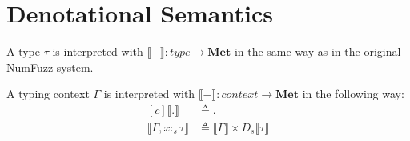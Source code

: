 \section{Denotational Semantics}
\begin{definition}
  A type $\tau$ is interpreted with $\llbracket - \rrbracket : \textit{type} \to
  \textbf{Met}$ in the same way as in the original NumFuzz system.
\end{definition}

\begin{definition}
  A typing context $\Gamma$ is interpreted with $\llbracket - \rrbracket :
  \textit{context} \to \textbf{Met}$ in the following way:
  \begin{equation}
  \begin{aligned}[c]
    \llbracket . \rrbracket &\triangleq . \\
    \llbracket \Gamma, x :_s \tau \rrbracket &\triangleq \llbracket \Gamma \rrbracket
      \times D_s \llbracket \tau \rrbracket
  \end{aligned}
  \end{equation}
\end{definition}

